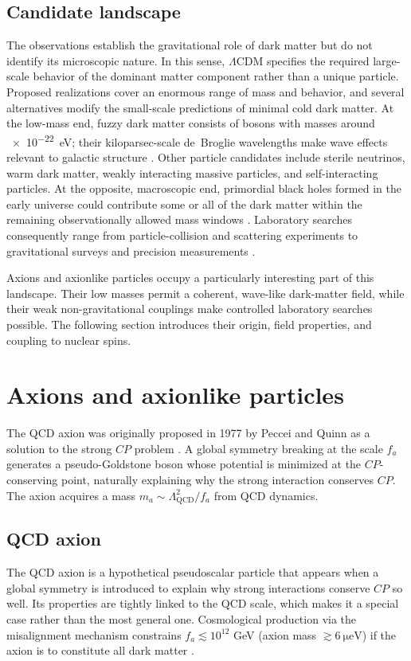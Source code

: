 \subsection{Candidate landscape}

The observations establish the gravitational role of dark matter but do not identify its microscopic nature.
In this sense, $\Lambda$CDM specifies the required large-scale behavior of the dominant matter component rather than a unique particle.
Proposed realizations cover an enormous range of mass and behavior, and several alternatives modify the small-scale predictions of minimal cold dark matter.
At the low-mass end, fuzzy dark matter consists of bosons with masses around \SI{e-22}{\eV}; their kiloparsec-scale de~Broglie wavelengths make wave effects relevant to galactic structure \cite{Lam2017_PhysRevD}.
Other particle candidates include sterile neutrinos, warm dark matter, weakly interacting massive particles, and self-interacting particles.
At the opposite, macroscopic end, primordial black holes formed in the early universe could contribute some or all of the dark matter within the remaining observationally allowed mass windows \cite{Carr2020_PBH_DarkMatter}.
Laboratory searches consequently range from particle-collision and scattering experiments to gravitational surveys and precision measurements \cite{Kimball2023_search}.

Axions and axionlike particles occupy a particularly interesting part of this landscape.
Their low masses permit a coherent, wave-like dark-matter field, while their weak non-gravitational couplings make controlled laboratory searches possible.
The following section introduces their origin, field properties, and coupling to nuclear spins.

\section{Axions and axionlike particles}\label{sec:intro:axions}
The QCD axion was originally proposed in 1977 by Peccei and Quinn as a solution to the strong $CP$ problem \cite{PecceiQuinn1977_CPConservation_PRL,PecceiQuinn1977_ConstraintsCP_PRD}.
A global symmetry breaking at the scale $f_a$ generates a pseudo-Goldstone boson whose potential is minimized at the $CP$-conserving point, naturally explaining why the strong interaction conserves $CP$.
The axion acquires a mass $m_a \sim \Lambda_\mathrm{QCD}^2/f_a$ from QCD dynamics.

\subsection{QCD axion}
The QCD axion is a hypothetical pseudoscalar particle that appears when a global symmetry is introduced to explain why strong interactions conserve $CP$ so well.
Its properties are tightly linked to the QCD scale, which makes it a special case rather than the most general one.
Cosmological production via the misalignment mechanism constrains $f_a \lesssim 10^{12}$ GeV (axion mass $\gtrsim \SI{6}{\micro\electronvolt}$) if the axion is to constitute all dark matter \cite{diCortona2016_QCDAxionPrecisely}.

